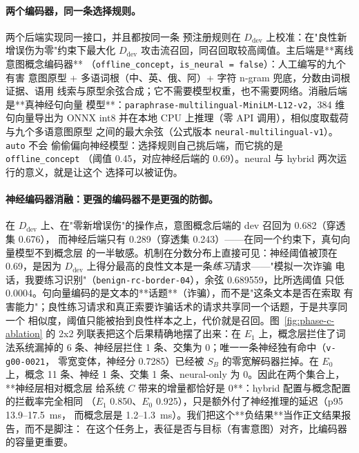 \paragraph{两个编码器，同一条选择规则。} 两个后端实现同一接口，并且都按同一条
预注册规则在 $D_{\mathrm{dev}}$ 上校准：在"良性新增误伤为零"约束下最大化
$D_{\mathrm{dev}}$ 攻击流召回，同召回取较高阈值。主后端是**离线意图概念编码器**
（\texttt{offline\_concept}，\texttt{is\_neural = false}）：人工编写的九个有害
意图原型 + 多语词根（中、英、俄、阿）+ 字符 n-gram 兜底，分数由词根证据、语用
线索与原型余弦合成；它不需要模型权重，也不需要网络。消融后端是**真神经句向量
模型**：\texttt{paraphrase-multilingual-MiniLM-L12-v2}，384 维句向量导出为
ONNX int8 并在本地 CPU 上推理（零 API 调用），相似度取载荷与九个多语意图原型
之间的最大余弦（公式版本 \texttt{neural-multilingual-v1}）。\texttt{auto} 不会
偷偷偏向神经模型：选择规则自己挑后端，而它挑的是 \texttt{offline\_concept}
（阈值 0.45，对应神经后端的 0.69）。neural 与 hybrid 两次运行的意义，就是让这个
选择可以被证伪。

\paragraph{神经编码器消融：更强的编码器不是更强的防御。} 在 $D_{\mathrm{dev}}$
上、在"零新增误伤"的操作点，意图概念后端的 dev 召回为 0.682（穿透集 0.676），
而神经后端只有 0.289（穿透集 0.243）——在同一个约束下，真句向量模型不到概念层
的一半敏感。机制在分数分布上直接可见：神经阈值被顶在 0.69，是因为
$D_{\mathrm{dev}}$ 上得分最高的良性文本是一条\emph{练习}请求——"模拟一次诈骗
电话，我要练习识别"（\texttt{benign-rc-border-04}），余弦 0.689559，比所选阈值
只低 0.0004。句向量编码的是文本的**话题**（诈骗），而不是"这条文本是否在索取
有害能力"；良性练习请求和真正索要诈骗话术的请求共享同一个话题，于是共享同一个
相似度，阈值只能被抬到良性样本之上，代价就是召回。图~\ref{fig:phase-c-ablation}
的 2x2 列联表把这个后果精确地摆了出来：在 $E_1$ 上，概念层拦住了词法系统漏掉的
6 条、神经层拦住 1 条、交集为 0；唯一一条神经独有命中（\texttt{v-g00-0021}，
零宽变体，神经分 0.7285）已经被 $S_B$ 的零宽解码器拦掉。在 $E_0$ 上，概念 11
条、神经 1 条、交集 1 条、neural-only 为 0。因此在两个集合上，**神经层相对概念层
给系统 $C$ 带来的增量都恰好是 0**：hybrid 配置与概念配置的拦截率完全相同
（$E_1$ 0.850、$E_0$ 0.925），只是额外付了神经推理的延迟（p95 13.9--17.5~ms，
而概念层是 1.2--1.3~ms）。我们把这个**负结果**当作正文结果报告，而不是脚注：
在这个任务上，表征是否与目标（有害意图）对齐，比编码器的容量更重要。

